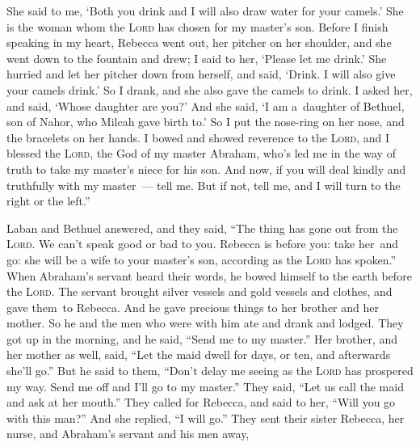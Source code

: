 \begin{inparaenum}
     She said to me, `Both you drink and I will also draw water for your camels.' She is the woman whom the \textsc{Lord} has chosen for my master's son.%
     Before I finish speaking in my heart, Rebecca went out, her pitcher on her shoulder, and she went down to the fountain and drew; I said to her, `Please let me drink.'%
     She hurried and let her pitcher down from herself, and said, `Drink. I will also give your camels drink.' So I drank, and she also gave the camels to drink.%
     I asked her, and said, `Whose daughter are you?' And she said, `I am a\understood\ daughter of Bethuel, son of Nahor, who Milcah gave birth to.' So I put the nose-ring on her nose, and the bracelets on her hands.%
     I bowed and showed reverence to the \textsc{Lord}, and I blessed the \textsc{Lord}, the God of my master Abraham, who's led me in the way of truth to take my master's niece for his son.%
     And now, if you will deal kindly and truthfully with my master~--- tell me. But if not, tell me, and I will turn to the right or the left.''%
    
     Laban and Bethuel answered, and they said, ``The thing has gone out from the \textsc{Lord}. We can't speak good or bad to you.%
     Rebecca is before you: take her\understood\ and go: she will be a wife to your master's son, according as the \textsc{Lord} has spoken.''%
     When Abraham's servant heard their words, he bowed himself to the earth before the \textsc{Lord}.%
     The servant brought silver vessels and gold vessels and clothes, and gave them\understood\ to Rebecca. And he gave precious things to her brother and her mother.%
     So he and the men who were with him ate and drank and lodged. They got up in the morning, and he said, ``Send me to my master.''%
     Her brother, and her mother as well, said, ``Let the maid dwell for days, or ten, and afterwards she'll go.''%
     But he said to them, ``Don't delay me seeing as the \textsc{Lord} has prospered my way. Send me off and I'll go to my master.''%
     They said, ``Let us call the maid and ask at her mouth.''%
     They called for Rebecca, and said to her, ``Will you go with this man?'' And she replied, ``I will go.''%
     They sent their sister Rebecca, her nurse, and Abraham's servant and his men away,%
     \smallskip%
    
    \pvdb{}{}%
    
    \pvdb{}{}%
    
\end{inparaenum}
